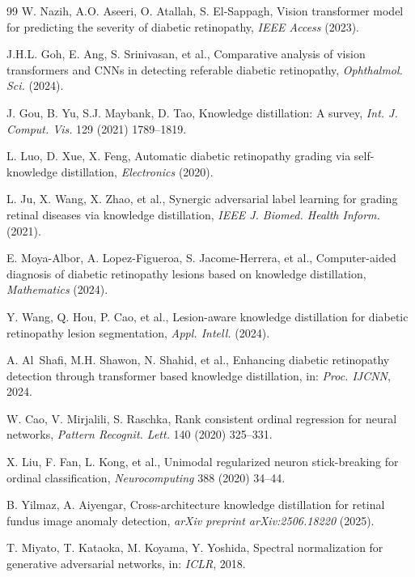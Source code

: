 \documentclass[a4paper,fleqn]{cas-dc}
\begin{document}
\begin{thebibliography}{99}
W. Nazih, A.O. Aseeri, O. Atallah, S. El-Sappagh,
Vision transformer model for predicting the severity of diabetic retinopathy,
\textit{IEEE Access} (2023).

J.H.L. Goh, E. Ang, S. Srinivasan, et al.,
Comparative analysis of vision transformers and CNNs in detecting referable diabetic retinopathy,
\textit{Ophthalmol. Sci.} (2024).

J. Gou, B. Yu, S.J. Maybank, D. Tao,
Knowledge distillation: A survey,
\textit{Int. J. Comput. Vis.} 129 (2021) 1789--1819.

L. Luo, D. Xue, X. Feng,
Automatic diabetic retinopathy grading via self-knowledge distillation,
\textit{Electronics} (2020).

L. Ju, X. Wang, X. Zhao, et al.,
Synergic adversarial label learning for grading retinal diseases via knowledge distillation,
\textit{IEEE J. Biomed. Health Inform.} (2021).

E. Moya-Albor, A. Lopez-Figueroa, S. Jacome-Herrera, et al.,
Computer-aided diagnosis of diabetic retinopathy lesions based on knowledge distillation,
\textit{Mathematics} (2024).

Y. Wang, Q. Hou, P. Cao, et al.,
Lesion-aware knowledge distillation for diabetic retinopathy lesion segmentation,
\textit{Appl. Intell.} (2024).

A. Al~Shafi, M.H. Shawon, N. Shahid, et al.,
Enhancing diabetic retinopathy detection through transformer based knowledge distillation,
in: \textit{Proc. IJCNN}, 2024.

W. Cao, V. Mirjalili, S. Raschka,
Rank consistent ordinal regression for neural networks,
\textit{Pattern Recognit. Lett.} 140 (2020) 325--331.

X. Liu, F. Fan, L. Kong, et al.,
Unimodal regularized neuron stick-breaking for ordinal classification,
\textit{Neurocomputing} 388 (2020) 34--44.

B. Yilmaz, A. Aiyengar,
Cross-architecture knowledge distillation for retinal fundus image anomaly detection,
\textit{arXiv preprint arXiv:2506.18220} (2025).

T. Miyato, T. Kataoka, M. Koyama, Y. Yoshida,
Spectral normalization for generative adversarial networks,
in: \textit{ICLR}, 2018.

\end{thebibliography}
\end{document}
